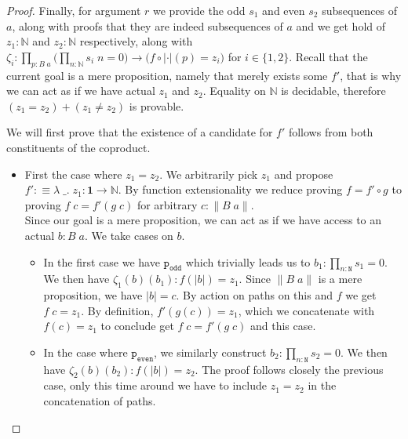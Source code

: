 \documentclass[12pt]{report}
\begin{document}
\begin{proof}
Finally, for argument $r$ we provide the odd $s_1$ and even $s_2$ subsequences of $a$, along with proofs that they are indeed subsequences of $a$ and we get hold of $z_1 : \mathbb{N}$ and $z_2 : \mathbb{N} $ respectively, along with $\zeta_i : \prod_{p : B\; a}\big(\prod_{n : \mathbb{N}}s_i\; n = 0 \big)\rightarrow\big(f\circ |\cdot|(p)=z_i\big)$ for $i \in \{1,2\}$. 
Recall that the current goal is a mere proposition, namely that merely exists some $f'$, that is why we can act as if we have actual $z_1$ and $z_2$. 
Equality on $\mathbb{N}$ is decidable, therefore $(z_1 = z_2) + (z_1 \neq z_2)$ is provable. 

We will first prove that the existence of a candidate for $f'$ follows from both constituents of the coproduct.
\begin{itemize}
\item First the case where $z_1= z_2$. 
We arbitrarily pick $z_1$ and propose $f' : \equiv \lambda \;\_.\; z_1 : \mathbf{1} \rightarrow \mathbb{N}$. 
By function extensionality we reduce proving $f= f' \circ g$ to proving $f\; c = f'(g\; c)$ for arbitrary $c : \lVert B\; a\rVert$.\\
Since our goal is a mere proposition, we can act as if we have access to an actual $b : B\; a$. 
We take cases on $b$. 
\begin{itemize}
\item In the first case we have $\mathtt{p_{odd}}$ which trivially leads us to $b_1 : \prod_{n : \mathtt{N}}s_1 = 0$. 
We then have $\zeta_1(b)(b_1) : f(|b|) = z_1$. 
Since $\lVert B\; a\rVert$ is a mere proposition, we have $|b| =c$. 
By action on paths on this and $f$ we get $f\; c= z_1$. 
By definition, $f'(g(c)) = z_1$, which we concatenate with $f(c) = z_1$ to conclude get $f\; c = f'(g\; c)$ and this case.
\item In the case where $\mathtt{p_{even}}$, we similarly construct $b_2 : \prod_{n : \mathtt{N}}s_2 = 0$. 
We then have $\zeta_2(b)(b_2) : f(|b|) = z_2$. 
The proof follows closely the previous case, only this time around we have to include $z_1=z_2$ in the concatenation of paths.

\end{itemize}


\end{itemize}
\end{proof}
\end{document}
